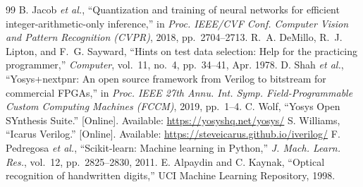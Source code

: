 \documentclass[conference]{IEEEtran}
\begin{document}
\begin{thebibliography}{99}
 B. Jacob \emph{et al.}, ``Quantization and training of neural networks for efficient integer-arithmetic-only inference,'' in \emph{Proc. IEEE/CVF Conf. Computer Vision and Pattern Recognition (CVPR)}, 2018, pp.~2704--2713.
 R.~A. DeMillo, R.~J. Lipton, and F.~G. Sayward, ``Hints on test data selection: Help for the practicing programmer,'' \emph{Computer}, vol.~11, no.~4, pp.~34--41, Apr. 1978.
 D. Shah \emph{et al.}, ``Yosys+nextpnr: An open source framework from Verilog to bitstream for commercial FPGAs,'' in \emph{Proc. IEEE 27th Annu. Int. Symp. Field-Programmable Custom Computing Machines (FCCM)}, 2019, pp.~1--4.
 C. Wolf, ``Yosys Open SYnthesis Suite.'' [Online]. Available: \url{https://yosyshq.net/yosys/}
 S. Williams, ``Icarus Verilog.'' [Online]. Available: \url{https://steveicarus.github.io/iverilog/}
 F. Pedregosa \emph{et al.}, ``Scikit-learn: Machine learning in Python,'' \emph{J. Mach. Learn. Res.}, vol.~12, pp.~2825--2830, 2011.
 E. Alpaydin and C. Kaynak, ``Optical recognition of handwritten digits,'' UCI Machine Learning Repository, 1998.
\end{thebibliography}
\end{document}
